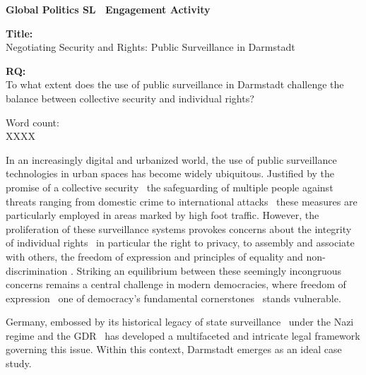 \documentclass[12pt]{article}
\begin{document}
	
	\begin{titlepage}
		\centering
		
		\textbf{Global Politics SL \textemdash\ Engagement Activity}
		
		\vspace*{4cm}
		
		\textbf{Title:}\\
		Negotiating Security and Rights: Public Surveillance in Darmstadt
		
		\vspace{1cm}
		
		\textbf{RQ:}\\
		To what extent does the use of public surveillance in Darmstadt challenge the balance between collective security and individual rights?
		
		\vspace{4cm}
		
		Word count:\\
		XXXX
		
		\vfill
	\end{titlepage}
	
	
	In an increasingly digital and urbanized world, the use of public surveillance technologies in urban spaces has become widely ubiquitous. Justified by the promise of a collective security \textemdash\ the safeguarding of multiple people against threats ranging from domestic crime to international attacks \parencites{noauthor_security_2025}{noauthor_collective_2025} \textemdash\ these measures are particularly employed in areas marked by high foot traffic. However, the proliferation of these surveillance systems provokes concerns about the integrity of individual rights \textemdash\ in particular the right to privacy, to assembly and associate with others, the freedom of expression and principles of equality and non-discrimination \parencite{nandy2023}. Striking an equilibrium between these seemingly incongruous concerns remains a central challenge in modern democracies, where freedom of expression \textemdash\ one of democracy's fundamental cornerstones \parencite{noauthor_special_nodate} \textemdash\ stands vulnerable. 
		
	Germany, embossed by its historical legacy of state surveillance \textemdash\ under the Nazi regime \parencite{mdrde_uberwachung_nodate} and the GDR \parencite{lichter_loeffler_siegloch2016} \textemdash\ has developed a multifaceted and intricate legal framework governing this issue. Within this context, Darmstadt emerges as an ideal case study.
	
\end{document}
